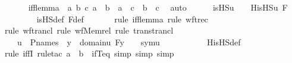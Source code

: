 \begin{isabellebody}
\ \ \ \ \isamarkupfalse%
\ iff{\isacharunderscore}{\kern0pt}lemma\ {\isacharcolon}{\kern0pt}\ {\isachardoublequoteopen}{\isasymAnd}a\ b\ c{\isachardot}{\kern0pt}\ a\ {\isacharequal}{\kern0pt}\ b\ {\isasymLongrightarrow}\ a\ {\isacharequal}{\kern0pt}\ c\ {\isasymlongleftrightarrow}\ b\ {\isacharequal}{\kern0pt}\ c{\isachardoublequoteclose}\ \isamarkupfalse%
\ auto\isanewline
\isanewline
\ \ \ \ \isamarkupfalse%
\ {\isachardoublequoteopen}is{\isacharunderscore}{\kern0pt}HS{\isacharparenleft}{\kern0pt}u{\isacharparenright}{\kern0pt}\ {\isacharequal}{\kern0pt}\ {}\ {\isasymlongleftrightarrow}\ His{\isacharunderscore}{\kern0pt}HS{\isacharparenleft}{\kern0pt}u{\isacharcomma}{\kern0pt}\ F{\isacharparenright}{\kern0pt}\ {\isacharequal}{\kern0pt}\ {}{\isachardoublequoteclose}\isanewline
\ \ \ \ \ \ \isamarkupfalse%
\ is{\isacharunderscore}{\kern0pt}HS{\isacharunderscore}{\kern0pt}def\ F{\isacharunderscore}{\kern0pt}def\isanewline
\ \ \ \ \ \ \isamarkupfalse%
{\isacharparenleft}{\kern0pt}rule\ iff{\isacharunderscore}{\kern0pt}lemma{\isacharcomma}{\kern0pt}\ rule\ wftrec{\isacharparenright}{\kern0pt}\isanewline
\ \ \ \ \ \ \ \isamarkupfalse%
{\isacharparenleft}{\kern0pt}rule\ wf{\isacharunderscore}{\kern0pt}trancl{\isacharcomma}{\kern0pt}\ rule\ wf{\isacharunderscore}{\kern0pt}Memrel{\isacharcomma}{\kern0pt}\ rule\ trans{\isacharunderscore}{\kern0pt}trancl{\isacharparenright}{\kern0pt}\isanewline
\ \ \ \ \ \ \isamarkupfalse%
\ \isanewline
\ \ \ \ \isamarkupfalse%
\ \isamarkupfalse%
\ {\isachardoublequoteopen}{\isachardot}{\kern0pt}{\isachardot}{\kern0pt}{\isachardot}{\kern0pt}\ {\isasymlongleftrightarrow}\ u\ {\isasymin}\ P{\isacharunderscore}{\kern0pt}names\ {\isasymand}\ {\isacharparenleft}{\kern0pt}{\isasymforall}y\ {\isasymin}\ domain{\isacharparenleft}{\kern0pt}u{\isacharparenright}{\kern0pt}{\isachardot}{\kern0pt}\ F{\isacharbackquote}{\kern0pt}y\ {\isacharequal}{\kern0pt}\ {}{\isacharparenright}{\kern0pt}\ {\isasymand}\ sym{\isacharparenleft}{\kern0pt}u{\isacharparenright}{\kern0pt}\ {\isasymin}\ {\isasymF}{\isachardoublequoteclose}\ \isanewline
\ \ \ \ \ \ \isamarkupfalse%
\ His{\isacharunderscore}{\kern0pt}HS{\isacharunderscore}{\kern0pt}def\ \isanewline
\ \ \ \ \ \ \isamarkupfalse%
{\isacharparenleft}{\kern0pt}rule\ iffI{\isacharcomma}{\kern0pt}\ rule{\isacharunderscore}{\kern0pt}tac\ a{\isacharequal}{\kern0pt}{}\ \ b{\isacharequal}{\kern0pt}{}\ \ ifT{\isacharunderscore}{\kern0pt}eq{\isacharcomma}{\kern0pt}\ simp{\isacharcomma}{\kern0pt}\ simp{\isacharcomma}{\kern0pt}\ simp{\isacharparenright}{\kern0pt}\isanewline

\end{isabellebody}
